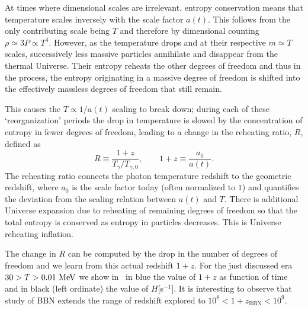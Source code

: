 At times where dimensional scales are irrelevant, entropy conservation means that temperature scales inversely with the scale factor $a(t)$. This follows from the only contributing scale being $T$ and therefore by dimensional counting $ \rho\simeq 3P \propto T^4$. However, as the temperature drops and at their respective $m\simeq T$ scales, successively less massive particles annihilate and disappear from the thermal Universe. Their entropy reheats the other degrees of freedom and thus in the process, the entropy originating in a massive degree of freedom is shifted into the effectively massless degrees of freedom that still remain. 

This causes the $T\propto 1/a(t)$ scaling to break down; during each of these `reorganization' periods the drop in temperature is slowed by the concentration of entropy in fewer degrees of freedom, leading to a change in the reheating ratio, $R$, defined as
\begin{equation}\label{redshiftratio}
R\equiv \frac{1+z}{ T_\gamma/T_{\gamma,0}}, \qquad 1+z\equiv \frac{a_{0}}{a(t)}.
\end{equation}
The reheating ratio connects the photon temperature redshift to the geometric redshift, where $a_0$ is the scale factor today (often normalized to $1$) and quantifies the deviation from the scaling relation between $a(t)$ and $T$. There is additional Universe expansion due to reheating of remaining degrees of freedom so that the total entropy is conserved as entropy in particles decreases. This is Universe reheating inflation.

The change in $R$ can be computed by the drop in the number of degrees of freedom and we learn from this actual redshift $1+z$. For the just discussed era $30>T>0.01\text{ MeV}$ we show in~ in blue the value of $1+z$ as function of time and in black (left ordinate) the value of $H$[s$^{-1}$]. It is interesting to observe that study of BBN extends the range of redshift explored to $10^8<1+z_\mathrm{BBN}<10^9$.

